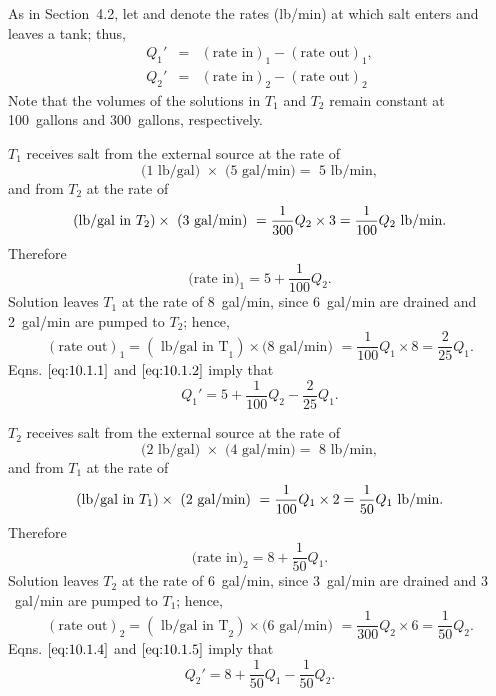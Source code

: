 \documentclass{ximera}
\begin{document}
\begin{example}
\begin{explanation}
As in Section~4.2, let  and  denote the rates (lb/min) at which salt enters and leaves a tank;
thus,
\begin{eqnarray*}
Q_1'&=&(\mbox{rate in})_1-(\mbox{rate out})_1,\\
Q_2'&=&(\mbox{rate in})_2-(\mbox{rate out})_2
\end{eqnarray*}
Note that the volumes of the solutions in $T_1$ and $T_2$
remain constant at 100~gallons and 300~gallons, respectively.

$T_1$ receives salt from the external source at the rate of
$$
\mbox{(1 lb/gal) }\times\mbox{ (5~gal/min)}=\mbox{ 5 lb/min},
$$
and from $T_2$ at the rate of
$$
\mbox{(lb/gal in }T_2)\times\mbox{ (3~gal/min)
}=\frac{1}{300}Q_2\times3\\=\frac{1}{100}Q_2 \mbox{ lb/min}.
$$
Therefore
\begin{equation} \label{eq:10.1.1}
\mbox{(rate in)}_1= 5+\frac{1}{100}Q_2.
\end{equation}
Solution leaves $T_1$  at the rate of 8~gal/min, since 6~gal/min are
drained and 2~gal/min are pumped to $T_2$; hence,
\begin{equation} \label{eq:10.1.2}
(\mbox{rate out})_1=(\mbox{ lb/gal in T}_1)\times \mbox{(8~gal/min) }
=\frac{1}{100}Q_1\times8=\frac{2}{25}Q_1.
\end{equation}
Eqns. $\eqref{eq:10.1.1}$ and $\eqref{eq:10.1.2}$  imply that
\begin{equation} \label{eq:10.1.3}
Q_1'=5+\frac{1}{100}Q_2-\frac{2}{25}Q_1.
\end{equation}

$T_2$ receives salt from the external source at the rate of
$$
\mbox{(2 lb/gal) }\times\mbox{ (4~gal/min)}=\mbox{ 8 lb/min},
$$
and from $T_1$ at the rate of
$$
\mbox{(lb/gal in }T_1)\times\mbox{ (2~gal/min)
}=\frac{1}{100}Q_1\times 2\\=\frac{1}{50}Q_1 \mbox{ lb/min}.
$$
Therefore
\begin{equation} \label{eq:10.1.4}
\mbox{(rate in)}_2= 8+\frac{1}{50}Q_1.
\end{equation}
Solution leaves $T_2$  at the rate of $6$~gal/min, since $3$~gal/min are
drained and $3$~gal/min are pumped to $T_1$; hence,
\begin{equation} \label{eq:10.1.5}
(\mbox{rate out})_2=(\mbox{ lb/gal in T}_2)\times \mbox{(6~gal/min) }
=\frac{1}{300}Q_2\times6=\frac{1}{50}Q_2.
\end{equation}
Eqns. $\eqref{eq:10.1.4}$ and $\eqref{eq:10.1.5}$ imply that
\begin{equation} \label{eq:10.1.6}
Q_2'=8+\frac{1}{50}Q_1-\frac{1}{50}Q_2.
\end{equation}


\end{explanation}
\end{example}
\end{document}
